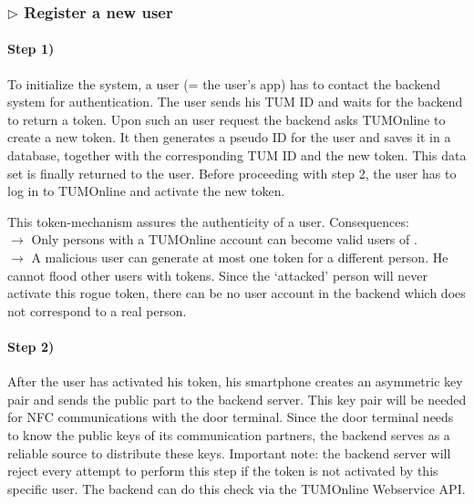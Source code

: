 \subsubsection*{$\triangleright$ Register a new user}

\paragraph{Step 1)}
To initialize the system, a user (= the user's \app app) has to contact the backend system for authentication.
The user sends his TUM ID and waits for the backend to return a token.
Upon such an user request the backend asks TUMOnline to create a new token.
It then generates a pseudo ID for the user and saves it in a database, together with the corresponding TUM ID and the new token.
This data set is finally returned to the user.
Before proceeding with step 2, the user has to log in to TUMOnline and activate the new token.

\medskip

\noindent This token-mechanism assures the authenticity of a user. Consequences:\\
$\rightarrow$ Only persons with a TUMOnline account can become valid users of \app.\\
$\rightarrow$ A malicious user can generate at most one token for a different person. He cannot flood other users with tokens. Since the `attacked' person will never activate this rogue token, there can be no user account in the backend which does not correspond to a real person.



\paragraph{Step 2)}
After the user has activated his token, his smartphone creates an asymmetric key pair and sends the public part to the backend server.
This key pair will be needed for NFC communications with the door terminal.
Since the door terminal needs to know the public keys of its communication partners, the backend serves as a reliable source to distribute these keys.
Important note: the backend server will reject every attempt to perform this step if the token is not activated by this specific user. The backend can do this check via the TUMOnline Webservice API.



